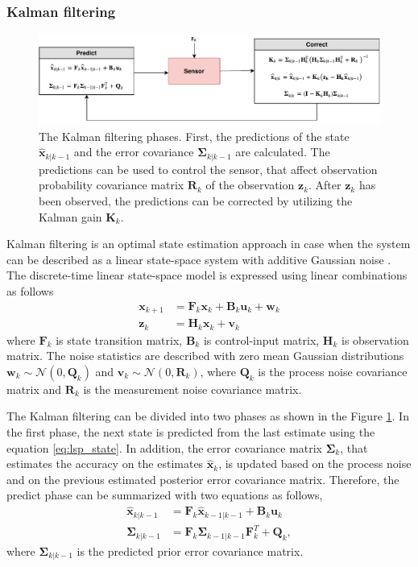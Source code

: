 \documentclass[english, 12pt, a4paper, elec, utf8, a-1b, online]{aaltothesis}
\newcommand{\xprior}{\hat{\vec{x}}_{k|k-1}}
\newcommand{\xlast}{\hat{\vec{x}}_{k-1|k-1}}
\newcommand{\priorecov}{\boldsymbol{\Sigma}_{k|k-1}}
\newcommand{\lastecov}{\boldsymbol{\Sigma}_{k-1|k-1}}
\newcommand{\ecov}{\boldsymbol{\Sigma}_k}
\renewcommand{\vec}[1]{\mathbf{#1}}
\newcommand{\x}{\bm{x}_k}
\newcommand{\xnext}{\bm{x}_{k+1}}
\newcommand{\xest}{\hat{\vec{x}}_k}
\newcommand{\z}{\bm{z}_k}
\newcommand{\stmodel}{\vec{F}_k}
\newcommand{\cimodel}{\vec{B}_k}
\newcommand{\cinput}{\vec{u}_k}
\newcommand{\pnoise}{\vec{w}_k}
\newcommand{\omodel}{\vec{H}_k}
\newcommand{\onoise}{\vec{v}_k}
\newcommand{\ocov}{\vec{R}_k}
\newcommand{\pcov}{\vec{Q}_k}
\newcommand{\gain}{\vec{K}_k}
\newcommand{\normal}[2]{\mathcal{N}\left(#1, #2 \right)}
\begin{document}
\subsubsection{Kalman filtering}

\begin{figure}[b]
    \centering
    \includegraphics[width=\textwidth]{figures/KF.pdf}
    \caption{The Kalman filtering phases.
    First, the predictions of the state $\xprior$ and the error covariance $\priorecov$ are calculated.
    The predictions can be used to control the sensor, that affect observation probability covariance matrix $\ocov$ of the observation $\z$.
    After $\z$ has been observed, the predictions can be corrected by utilizing the Kalman gain $\gain$.
    }
    \label{fig:KF}
\end{figure}

Kalman filtering is an optimal state estimation approach in case when the system can be described as a linear state-space system with additive Gaussian noise \cite{Krishnamurthy2016}.
The discrete-time linear state-space model is expressed using linear combinations as follows 
\begin{align}
    \xnext &= \stmodel \x + \cimodel \cinput + \pnoise \label{eq:lsp_state} \\
    \z &= \omodel \x + \onoise \label{eq:lsp_obs}
\end{align}
where $\stmodel$ is state transition matrix, $\cimodel$ is control-input matrix, $ \omodel $ is observation matrix. 
The noise statistics are described with zero mean Gaussian distributions $\pnoise \sim \normal{0}{\pcov}$ and $\onoise \sim \normal{0}{\ocov}$, where $\pcov$ is the process noise covariance matrix and $\ocov$ is the measurement noise covariance matrix.

The Kalman filtering can be divided into two phases as shown in the Figure \ref{fig:KF}.
In the first phase, the next state is predicted from the last estimate using the equation \eqref{eq:lsp_state}.
In addition, the error covariance matrix $\ecov$, that estimates the accuracy on the estimates $\xest$, is updated based on the process noise and on the previous estimated posterior error covariance matrix.
Therefore, the predict phase can be summarized with two equations as follows,
\begin{subequations}
\label{eq:kf_predict}
\begin{align}
    \xprior &= \stmodel \xlast + \cimodel \cinput \label{eq:kf_pred_x} \\ 
    \priorecov &= \stmodel \lastecov \stmodel^T + \pcov \label{eq:kf_prior_error_cov},
\end{align}
\end{subequations}
where $\priorecov$ is the predicted prior error covariance matrix.
\end{document}
